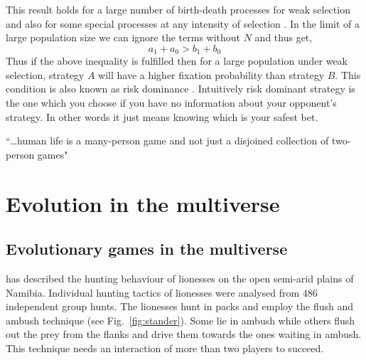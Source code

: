 \documentclass[oneside,11pt,a4paper]{book}
\begin{document}
%
This result holds for a large number of birth-death processes for weak selection \citep{nowak:2004pw,antal:2009th}
and also for some special processes at any intensity of selection \citep{antal:2009th}.
In the limit of a large population size we can ignore the terms without $N$ and thus get,
%
\begin{equation}
\label{rdcond}
a_1+a_0 > b_1 + b_0
\end{equation}
%
Thus if the above inequality is fulfilled then for a large population under weak selection, strategy $A$ will have a higher fixation probability than strategy $B$.
This condition is also known as risk dominance \citep{harsanyi:1988mm,kandori:1993aa}.
Intuitively risk dominant strategy is the one which you choose if you have no information about your opponent's strategy.
In other words it just means knowing which is your safest bet.


\begin{savequote}[10pc]
\sffamily
``\ldots human life is a many-person game and not just a disjoined collection of two-person games"
\end{savequote}

\chapter{Evolution in the multiverse}
\label{chap:multiverse}

\graphicspath{{Figs_Multiverse/}{Figs_Multiverse/}{Figs_Multiverse/}}

\section{Evolutionary games in the multiverse}
\label{sec:multiverse}

\citet{stander:1992aa} has described the hunting behaviour of lionesses on the open semi-arid plains of Namibia.
Individual hunting tactics of lionesses were analysed from $486$ independent group hunts.
The lionesses hunt in packs and employ the flush and ambush technique (see Fig.\ \ref{fig:stander}).
Some lie in ambush while others flush out the prey from the flanks and drive them towards the ones waiting in ambush.
This technique needs an interaction of more than two players to succeed.
\end{document}
